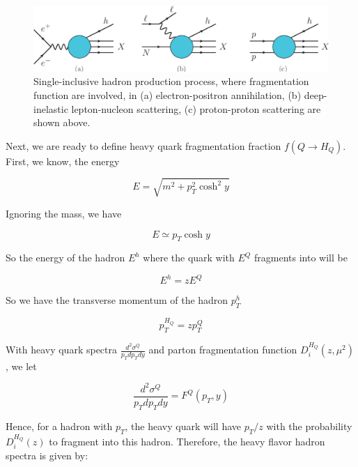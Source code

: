  \begin{figure}[hbtp]
\begin{center}
\includegraphics[width=1.0\textwidth]{Figures/Chapter1/FFProcess.png}
\caption{Single-inclusive hadron production process, where fragmentation function are involved, in (a) electron-positron annihilation, (b) deep-inelastic lepton-nucleon scattering, (c) proton-proton scattering are shown above.}
\label{FFProcess}
\end{center}
\end{figure}   

Next, we are ready to define heavy quark fragmentation fraction $f(Q \rightarrow H_Q)$. First, we know, the energy

\begin{equation}
E=  \sqrt{m^2 + p_T^2 \cosh^2 y}
\end{equation}

Ignoring the mass, we have

\begin{equation}
E \simeq p_T \cosh y
\end{equation}

So the energy of the hadron $E^h$ where the quark with $E^Q$ fragments into will be


\begin{equation}
E^h  = z E^Q 
\end{equation}

So we have the transverse momentum of the hadron $p_T^h$ 

\begin{equation}
p_T^{H_Q} = z p_T^Q
\end{equation}

With heavy quark spectra $ \frac{d^2\sigma^Q}{p_T dp_T dy}$ and parton fragmentation function $D_{i}^{H_Q}(z,\mu^2)$, we let


\begin{equation}
 \frac{d^2\sigma^Q}{p_T dp_T dy} = F^Q(p_T, y)
\end{equation}


Hence, for a hadron with $p_T$, the heavy quark will have $p_T/z$ with the probability $D^{H_Q}_{i}(z)$ to fragment into this hadron. Therefore, the heavy flavor hadron spectra is given by:

